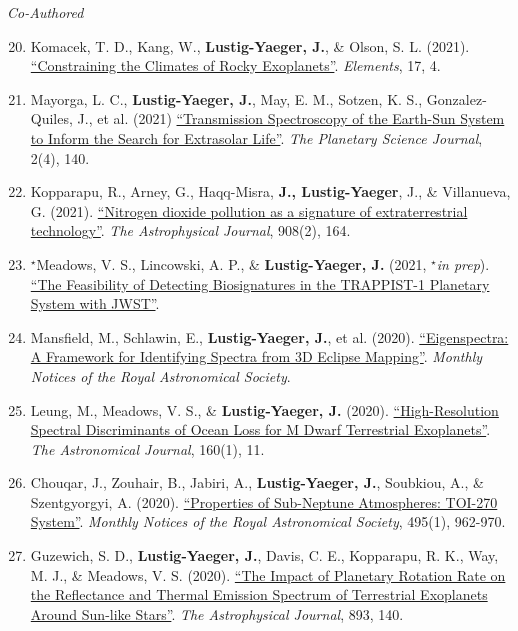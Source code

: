 \documentclass[margin,10pt]{res}
\newenvironment{benumerate}[1]{
    \let\oldItem\item
    \def\item{\addtocounter{enumi}{-2}\oldItem}
    \begin{enumerate}
    \setcounter{enumi}{#1}
    \addtocounter{enumi}{1}
}{
    \end{enumerate}
}
\begin{document}
\begin{resume}
                {\sl Co-Authored}
                \begin{benumerate}{19}
                    \item Komacek, T. D., Kang, W., \textbf{Lustig-Yaeger, J.}, \& Olson, S. L. (2021). \href{https://ui.adsabs.harvard.edu/abs/2021arXiv210808386K/abstract}{``Constraining the Climates of Rocky Exoplanets''}. \textit{Elements}, 17, 4.
                    \item Mayorga, L. C., \textbf{Lustig-Yaeger, J.}, May, E. M., Sotzen, K. S., Gonzalez-Quiles, J., et al. (2021) \href{https://ui.adsabs.harvard.edu/abs/2021PSJ.....2..140M/abstract}{``Transmission Spectroscopy of the Earth-Sun System to Inform the Search for Extrasolar Life''}. \textit{The Planetary Science Journal}, 2(4), 140. 
                    \item Kopparapu, R., Arney, G., Haqq-Misra, \textbf{J., Lustig-Yaeger}, J., \& Villanueva, G. (2021). \href{https://ui.adsabs.harvard.edu/abs/2021ApJ...908..164K/abstract}{``Nitrogen dioxide pollution as a signature of extraterrestrial technology''}. \textit{The Astrophysical Journal}, 908(2), 164.
                    \item $^{\star}$Meadows, V. S., Lincowski, A. P., \& \textbf{Lustig-Yaeger, J.} (2021, $^{\star}$\textit{in prep}). \href{}{``The Feasibility of Detecting Biosignatures in the TRAPPIST-1 Planetary System with JWST''}. %
                    \item Mansfield, M., Schlawin, E., \textbf{Lustig-Yaeger, J.}, et al. (2020). \href{https://ui.adsabs.harvard.edu/abs/2020MNRAS.499.5151M/abstract}{``Eigenspectra: A Framework for Identifying Spectra from 3D Eclipse Mapping''}. \textit{Monthly Notices of the Royal Astronomical Society}.
                    \item Leung, M., Meadows, V. S., \& \textbf{Lustig-Yaeger, J.} (2020). \href{https://ui.adsabs.harvard.edu/abs/2020arXiv200413731L/abstract}{``High-Resolution Spectral Discriminants of Ocean Loss for M Dwarf Terrestrial Exoplanets''}. \textit{The Astronomical Journal}, 160(1), 11. 
                    \item Chouqar, J., Zouhair, B., Jabiri, A., \textbf{Lustig-Yaeger, J.}, Soubkiou, A., \& Szentgyorgyi, A. (2020). \href{https://ui.adsabs.harvard.edu/abs/2020MNRAS.495..962C/abstract}{``Properties of Sub-Neptune Atmospheres: TOI-270 System''}. \textit{Monthly Notices of the Royal Astronomical Society}, 495(1), 962-970.
                    \item Guzewich, S. D., \textbf{Lustig-Yaeger, J.}, Davis, C. E., Kopparapu, R. K., Way, M. J., \& Meadows, V. S.  (2020). \href{https://ui.adsabs.harvard.edu/abs/2020arXiv200202549G/abstract}{``The Impact of Planetary Rotation Rate on the Reflectance and Thermal Emission Spectrum of Terrestrial Exoplanets Around Sun-like Stars''}. \textit{The Astrophysical Journal}, 893, 140. 

\end{benumerate}
\end{resume}
\end{document}
